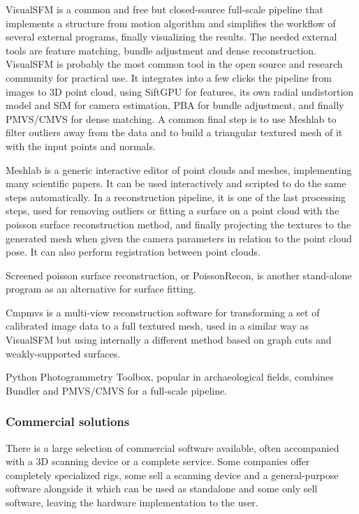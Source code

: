 VisualSFM \cite{wu2013towards} is a common and free but closed-source full-scale pipeline that implements a structure from motion algorithm and simplifies the workflow of several external programs, finally visualizing the results.
The needed external tools are feature matching, bundle adjustment and dense reconstruction.
VisualSFM is probably the most common tool in the open source and research community for practical use.
It integrates into a few clicks the pipeline from images to 3D point cloud, using SiftGPU for features, its own radial undistortion model and SfM for camera estimation, PBA for bundle adjustment, and finally PMVS/CMVS for dense matching.
A common final step is to use Meshlab to filter outliers away from the data and to build a triangular textured mesh of it with the input points and normals.

Meshlab \cite{meshlab} is a generic interactive editor of point clouds and meshes, implementing many scientific papers.
It can be used interactively and scripted to do the same steps automatically.
In a reconstruction pipeline, it is one of the last processing steps, used for removing outliers or fitting a surface on a point cloud with the poisson surface reconstruction method, and finally projecting the textures to the generated mesh when given the camera parameters in relation to the point cloud pose.
It can also perform registration between point clouds.

Screened poisson surface reconstruction, or PoissonRecon, is another stand-alone program as an alternative for surface fitting. \cite{kazhdan2013screened}

Cmpmvs is a multi-view reconstruction software for transforming a set of calibrated image data to a full textured mesh, used in a similar way as VisualSFM but using internally a different method based on graph cuts and weakly-supported surfaces.
\cite{jancosek2011multi}

Python Photogrammetry Toolbox, popular in archaeological fields, combines Bundler and PMVS/CMVS for a full-scale pipeline. \cite{moulon2011python}



\subsubsection{Commercial solutions} %

There is a large selection of commercial software available, often accompanied with a 3D scanning device or a complete service.
Some companies offer completely specialized rigs, some sell a scanning device and a general-purpose software alongside it which can be used as standalone and some only sell software, leaving the hardware implementation to the user.

